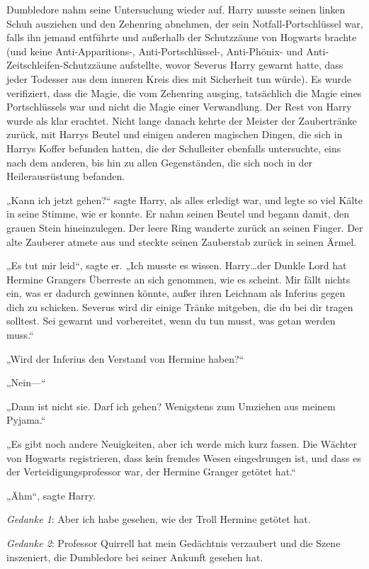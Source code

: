 {Dumbledore nahm seine Untersuchung wieder auf. Harry musste seinen linken Schuh ausziehen und den Zehenring abnehmen, der sein Notfall-Portschlüssel war, falls ihn jemand entführte und außerhalb der Schutzzäune von Hogwarts brachte (und keine Anti-Apparitions-, Anti-Portschlüssel-, Anti-Phönix- und Anti-Zeitschleifen-Schutzzäune aufstellte, wovor Severus Harry gewarnt hatte, dass jeder Todesser aus dem inneren Kreis dies mit Sicherheit tun würde). Es wurde verifiziert, dass die Magie, die vom Zehenring ausging, tatsächlich die Magie eines Portschlüssels war und nicht die Magie einer Verwandlung. Der Rest von Harry wurde als klar erachtet. Nicht lange danach kehrte der Meister der Zaubertränke zurück, mit Harrys Beutel und einigen anderen magischen Dingen, die sich in Harrys Koffer befunden hatten, die der Schulleiter ebenfalls untersuchte, eins nach dem anderen, bis hin zu allen Gegenständen, die sich noch in der Heilerausrüstung befanden.

„Kann ich jetzt gehen?“ sagte Harry, als alles erledigt war, und legte so viel Kälte in seine Stimme, wie er konnte. Er nahm seinen Beutel und begann damit, den grauen Stein hineinzulegen. Der leere Ring wanderte zurück an seinen Finger. Der alte Zauberer atmete aus und steckte seinen Zauberstab zurück in seinen Ärmel.

„Es tut mir leid“, sagte er. „Ich musste es wissen. Harry…der Dunkle Lord hat Hermine Grangers Überreste an sich genommen, wie es scheint. Mir fällt nichts ein, was er dadurch gewinnen könnte, außer ihren Leichnam als Inferius gegen dich zu schicken. Severus wird dir einige Tränke mitgeben, die du bei dir tragen solltest. Sei gewarnt und vorbereitet, wenn du tun musst, was getan werden muss.“

„Wird der Inferius den Verstand von Hermine haben?“

„Nein—“

„Dann ist nicht sie. Darf ich gehen? Wenigstens zum Umziehen aus meinem Pyjama.“

„Es gibt noch andere Neuigkeiten, aber ich werde mich kurz fassen. Die Wächter von Hogwarts registrieren, dass kein fremdes Wesen eingedrungen ist, und dass es der Verteidigungsprofessor war, der Hermine Granger getötet hat.“

„Ähm“, sagte Harry.

\emph{Gedanke 1}: Aber ich habe gesehen, wie der Troll Hermine getötet hat.

\emph{Gedanke 2}: Professor Quirrell hat mein Gedächtnis verzaubert und die Szene inszeniert, die Dumbledore bei seiner Ankunft gesehen hat.

}
